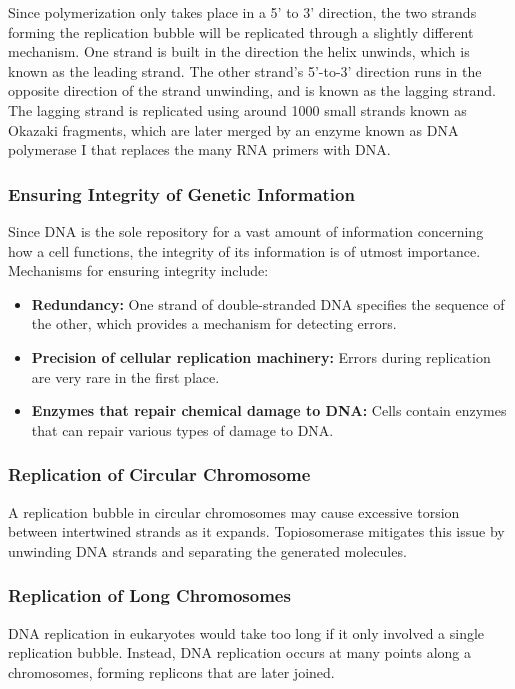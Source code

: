 \documentclass[12pt,titlepage]{article}
\begin{document}
        Since polymerization only takes place in a 5' to 3' direction, the two strands forming the replication bubble will be replicated through a slightly different
        mechanism. One strand is built in the direction the helix unwinds, which is known as the leading strand. The other strand's 5'-to-3' direction runs in the
        opposite direction of the strand unwinding, and is known as the lagging strand. The lagging strand is replicated using around 1000 small strands known as
        Okazaki fragments, which are later merged by an enzyme known as DNA polymerase I that replaces the many RNA primers with DNA.

      \subsubsection{Ensuring Integrity of Genetic Information}
        Since DNA is the sole repository for a vast amount of information concerning how a cell functions, the integrity of its information is of utmost importance.
        Mechanisms for ensuring integrity include:
        \begin{itemize}
          \item \textbf{Redundancy:} One strand of double-stranded DNA specifies the sequence of the other, which provides a mechanism for detecting errors.
          \item \textbf{Precision of cellular replication machinery:} Errors during replication are very rare in the first place.
          \item \textbf{Enzymes that repair chemical damage to DNA:} Cells contain enzymes that can repair various types of damage to DNA.
        \end{itemize}

      \subsubsection{Replication of Circular Chromosome}
        A replication bubble in circular chromosomes may cause excessive torsion between intertwined strands as it expands. Topiosomerase mitigates this issue by
        unwinding DNA strands and separating the generated molecules.

      \subsubsection{Replication of Long Chromosomes}
        DNA replication in eukaryotes would take too long if it only involved a single replication bubble. Instead, DNA replication occurs at many points along
        a chromosomes, forming replicons that are later joined.
\end{document}
